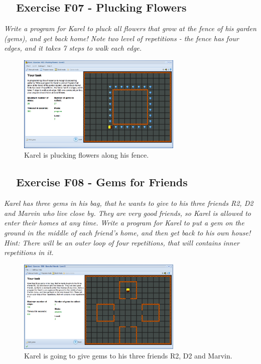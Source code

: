 \documentclass[article,A4,12pt]{llncs}
\begin{document}
{{{{\subsection{\ \ Exercise F07 - Plucking Flowers}

{\em Write a program for Karel to pluck all flowers that grow at the fence of his garden (gems), and get back home! Note two level of repetitions - the fence has four edges, and it takes 7 steps to walk each edge.}


\begin{figure}[!ht]
\begin{center}
\includegraphics[width=0.7\textwidth]{img/g02.png}
\end{center}
\vspace{-4mm}
\caption{Karel is plucking flowers along his fence.}
\label{fig:g02}
\vspace{-4mm}
\end{figure}
\noindent

\subsection{\ \ Exercise F08 - Gems for Friends}

{\em Karel has three gems in his bag, that he wants to give to his three friends R2, D2 and Marvin who live close by. They are very good friends, so Karel is allowed to enter their homes at any time. Write a program for Karel to put a gem on the ground in the middle of each friend's home, and then get back to his own house! Hint: There will be an outer loop of four repetitions, that will contains inner repetitions in it.}


\begin{figure}[!ht]
\begin{center}
\includegraphics[width=0.7\textwidth]{img/g03.png}
\end{center}
\vspace{-4mm}
\caption{Karel is going to give gems to his three friends R2, D2 and Marvin.}
\label{fig:g03}
\vspace{-4mm}
\end{figure}
\noindent

}}}}
\end{document}
